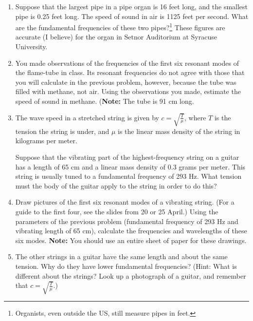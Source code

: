 \documentclass[12pt]{article}
\begin{document}
\Large
\centerline{}
\normalsize
\centerline{}


\begin{enumerate}

\item Suppose that the largest pipe in a pipe organ is 16 feet long, and the smallest pipe is 0.25 feet long. The speed of sound in air is 1125 feet per second. What 
are the fundamental frequencies of these two pipes?\footnote{Organists, even outside the US, still measure pipes in feet.} These figures are accurate (I believe) for the
organ in Setnor Auditorium at Syracuse University.

\item You made observations of the frequencies of the first six resonant modes of the flame-tube in class. Its resonant frequencies do not agree with those that you will
calculate in the previous problem, however, because the tube was filled with methane, not air. Using the observations you made, estimate the speed of sound in methane.
({\bf Note:} The tube is 91 cm long. 

\item The wave speed in a stretched string is given by $c=\sqrt{\frac{T}{\mu}}$, where $T$ is the tension the string is under, and $\mu$ is the linear mass 
density of the string in kilograms per meter. 

Suppose that the vibrating part of the highest-frequency string on a guitar has a length of 65 cm and a linear mass density of 0.3 grams per meter. This string
is usually tuned to a fundamental frequency of 293 Hz. What tension must the body of the guitar apply to the string in order to do this?

\item Draw pictures of the first six resonant modes of a vibrating string. (For a guide to the first four, see the slides from 20 or 25 April.) Using the parameters
of the previous problem (fundamental frequency of 293 Hz and vibrating length of 65 cm), calculate the frequencies and wavelengths of these six modes. {\bf Note: 
} You should use an entire sheet of paper for these drawings.

\item The other strings in a guitar have the same length and about the same tension. Why do they have lower fundamental frequencies? (Hint: What is different 
about the strings? Look up a photograph of a guitar, and remember that $c=\sqrt{\frac{T}{\mu}}$.) 


\end{enumerate}
\end{document}
